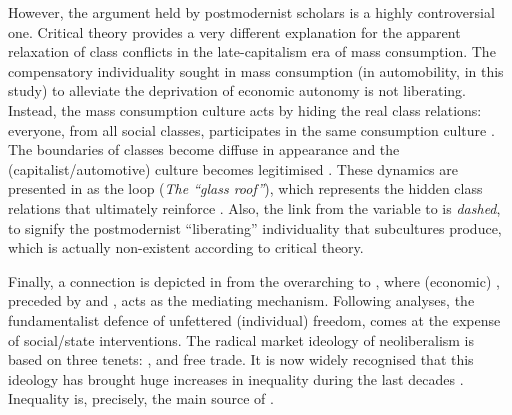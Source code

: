 However, the argument held by postmodernist scholars is a highly controversial one. Critical theory provides a very different explanation for the apparent relaxation of class conflicts in the late-capitalism era of mass consumption. The compensatory individuality sought in mass consumption (in automobility, in this study) to alleviate the deprivation of economic autonomy is not liberating. Instead, the mass consumption culture acts by hiding the real class relations: everyone, from all social classes, participates in the same consumption culture \parencite{gartman1991_CultureasClass,marcuse2013_OneDimensionalMan}. The boundaries of classes become diffuse in appearance and the (capitalist/automotive) culture becomes legitimised \parencite{gartman2004_ThreeAgesAutomobile}. These dynamics are presented in  as the  loop (\emph{The ``glass roof''}), which represents the hidden class relations that ultimately reinforce . Also, the link from the  variable to  is \emph{dashed}, to signify the postmodernist ``liberating'' individuality that subcultures produce, which is actually non-existent according to critical theory. 

Finally, a connection is depicted in  from the overarching  to , where (economic) , preceded by  and , acts as the mediating mechanism. Following \textcite{monbiot2016_Neoliberalismideology,klein2008_shockdoctrinerise} analyses, the fundamentalist defence of unfettered (individual) freedom, comes at the expense of social/state interventions. The radical market ideology of neoliberalism is based on three tenets: ,  and free trade. It is now widely recognised that this ideology has brought huge increases in inequality during the last decades \parencite{milanovic2016_GlobalInequality,piketty2014_CapitalTwentyFirst}. Inequality is, precisely, the main source of .

%
%
